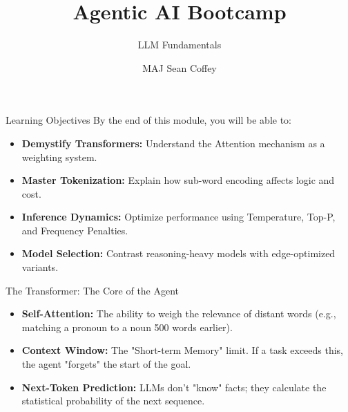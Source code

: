 \documentclass{beamer}       %
\title[]{Agentic AI Bootcamp}
\subtitle[] %
{LLM Fundamentals}
\author[] %
{MAJ Sean Coffey} %
\institute
{Army Cyber Institute, U.S. Military Academy}
\date{\monthyeardate}
\begin{document}
{\DivisionLogo
\begin{frame}
    \titlepage
\end{frame}
}



\begin{frame}{Learning Objectives}
    By the end of this module, you will be able to:
    \begin{itemize}
        \item \textbf{Demystify Transformers:} Understand the Attention mechanism as a weighting system.
        \item \textbf{Master Tokenization:} Explain how sub-word encoding affects logic and cost.
        \item \textbf{Inference Dynamics:} Optimize performance using Temperature, Top-P, and Frequency Penalties.
        \item \textbf{Model Selection:} Contrast reasoning-heavy models with edge-optimized variants.
    \end{itemize}
\end{frame}

\begin{frame}{The Transformer: The Core of the Agent}
    \centering
    
    \begin{itemize}
        \item \textbf{Self-Attention:} The ability to weigh the relevance of distant words (e.g., matching a pronoun to a noun 500 words earlier).
        \item \textbf{Context Window:} The "Short-term Memory" limit. If a task exceeds this, the agent "forgets" the start of the goal.
        \item \textbf{Next-Token Prediction:} LLMs don't "know" facts; they calculate the statistical probability of the next sequence.
    \end{itemize}
\end{frame}
\end{document}
